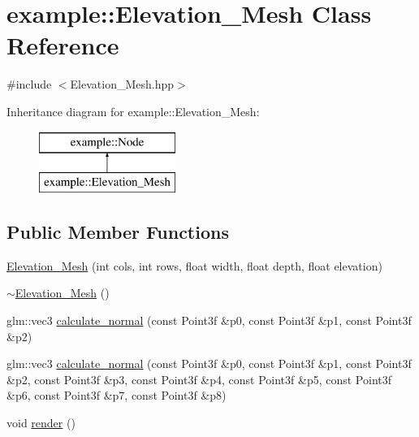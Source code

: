 \hypertarget{classexample_1_1_elevation___mesh}{}\section{example\+:\+:Elevation\+\_\+\+Mesh Class Reference}
\label{classexample_1_1_elevation___mesh}


{\ttfamily \#include $<$Elevation\+\_\+\+Mesh.\+hpp$>$}

Inheritance diagram for example\+:\+:Elevation\+\_\+\+Mesh\+:\begin{figure}[H]
\begin{center}
\leavevmode
\includegraphics[height=2.000000cm]{classexample_1_1_elevation___mesh}
\end{center}
\end{figure}
\subsection*{Public Member Functions}
\begin{DoxyCompactItemize}
\item 
\mbox{\hyperlink{classexample_1_1_elevation___mesh_a585a87a8af21d707e5608440c8c8ac6e}{Elevation\+\_\+\+Mesh}} (int cols, int rows, float width, float depth, float elevation)
\item 
\mbox{\hyperlink{classexample_1_1_elevation___mesh_a64aaa59bc4b872cf5180e444d3cb1073}{$\sim$\+Elevation\+\_\+\+Mesh}} ()
\item 
glm\+::vec3 \mbox{\hyperlink{classexample_1_1_elevation___mesh_a3a4637a65ae4c1a7d0f051d26b1f78d8}{calculate\+\_\+normal}} (const Point3f \&p0, const Point3f \&p1, const Point3f \&p2)
\item 
glm\+::vec3 \mbox{\hyperlink{classexample_1_1_elevation___mesh_aee6583fd55f431f0a6b8dc8e99b6db94}{calculate\+\_\+normal}} (const Point3f \&p0, const Point3f \&p1, const Point3f \&p2, const Point3f \&p3, const Point3f \&p4, const Point3f \&p5, const Point3f \&p6, const Point3f \&p7, const Point3f \&p8)
\item 
void \mbox{\hyperlink{classexample_1_1_elevation___mesh_a67216abcf32e92e3da91810e10822c6e}{render}} ()
\end{DoxyCompactItemize}


